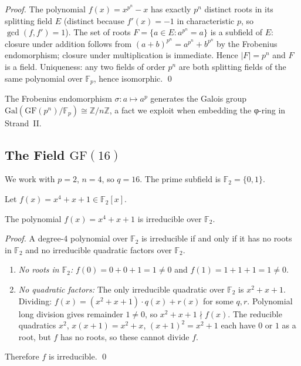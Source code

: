 \begin{proof}
The polynomial \(f(x)=x^{p^n}-x\) has exactly \(p^n\) distinct roots in
its splitting field \(E\) (distinct because \(f'(x)=-1\) in characteristic \(p\),
so \(\gcd(f,f')=1\)).
The set of roots \(F = \{a\in E : a^{p^n}=a\}\) is a subfield of \(E\):
closure under addition follows from
\((a+b)^{p^n} = a^{p^n}+b^{p^n}\) by the Frobenius endomorphism;
closure under multiplication is immediate.
Hence \(|F|=p^n\) and \(F\) is a field.
Uniqueness: any two fields of order \(p^n\) are both splitting fields of
the same polynomial over \(\mathbb{F}_p\), hence isomorphic.
\qed
\end{proof}

\begin{remark}
The Frobenius endomorphism \(\sigma\colon a\mapsto a^{p}\) generates
the Galois group \(\mathrm{Gal}(\mathrm{GF}(p^n)/\mathbb{F}_p)\cong\mathbb{Z}/n\mathbb{Z}\),
a fact we exploit when embedding the φ-ring in Strand~II.
\end{remark}

\subsection{The Field \(\mathrm{GF}(16)\)}
\label{sec:gf16-construction}

We work with \(p=2\), \(n=4\), so \(q=16\).
The prime subfield is \(\mathbb{F}_2 = \{0,1\}\).

\begin{definition}
\label{def:irred-poly}
Let \(f(x) = x^4 + x + 1 \in \mathbb{F}_2[x]\).
\end{definition}

\begin{proposition}
\label{prop:f-irreducible}
The polynomial \(f(x)=x^4+x+1\) is irreducible over \(\mathbb{F}_2\).
\end{proposition}

\begin{proof}
A degree-4 polynomial over \(\mathbb{F}_2\) is irreducible if and only if it
has no roots in \(\mathbb{F}_2\) and no irreducible quadratic factors
over \(\mathbb{F}_2\).
\begin{enumerate}
  \item \emph{No roots in \(\mathbb{F}_2\):}
    \(f(0)=0+0+1=1\neq 0\) and \(f(1)=1+1+1=1\neq 0\).
  \item \emph{No quadratic factors:}
    The only irreducible quadratic over \(\mathbb{F}_2\) is \(x^2+x+1\).
    Dividing: \(f(x) = (x^2+x+1)\cdot q(x) + r(x)\) for some \(q,r\).
    Polynomial long division gives remainder \(1\neq 0\), so \(x^2+x+1\nmid f(x)\).
    The reducible quadratics \(x^2\), \(x(x+1)=x^2+x\), \((x+1)^2=x^2+1\)
    each have \(0\) or \(1\) as a root, but \(f\) has no roots, so these
    cannot divide \(f\).
\end{enumerate}
Therefore \(f\) is irreducible.
\qed
\end{proof}


